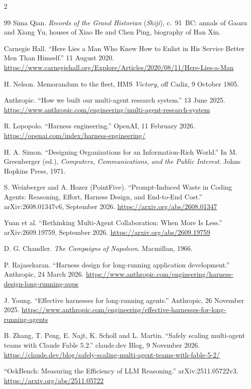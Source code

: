 \documentclass[11pt,letterpaper]{article}
\begin{document}
\begin{multicols}{2}
{\begin{thebibliography}{99}
 Sima Qian. \emph{Records of the Grand Historian} (\emph{Shiji}), c.~91~BC:
annals of Gaozu and Xiang Yu, houses of Xiao He and Chen Ping, biography of Han Xin.

 Carnegie Hall. ``Here Lies a Man Who Knew How to Enlist in His Service
Better Men Than Himself.'' 11 August 2020.
\url{https://www.carnegiehall.org/Explore/Articles/2020/08/11/Here-Lies-a-Man}

 H. Nelson. Memorandum to the fleet, HMS \emph{Victory}, off Cadiz,
9 October 1805.

 Anthropic. ``How we built our multi-agent research system.''
13 June 2025.
\url{https://www.anthropic.com/engineering/multi-agent-research-system}

 R. Lopopolo. ``Harness engineering.'' OpenAI, 11 February 2026.
\url{https://openai.com/index/harness-engineering/}

 H. A. Simon. ``Designing Organizations for an Information-Rich World.'' In
M. Greenberger (ed.), \emph{Computers, Communications, and the Public Interest}. Johns
Hopkins Press, 1971.

 S. Weinberger and A. Hozez (PointFive). ``Prompt-Induced Waste in Coding
Agents: Reasoning, Effort, Harness Design, and End-to-End Cost.'' arXiv:2608.01347v6,
September 2026.
\url{https://arxiv.org/abs/2608.01347}

 Yuan et al. ``Rethinking Multi-Agent Collaboration: When More Is Less.''
arXiv:2609.19759, September 2026.
\url{https://arxiv.org/abs/2609.19759}

 D. G. Chandler. \emph{The Campaigns of Napoleon}. Macmillan, 1966.

 P. Rajasekaran. ``Harness design for long-running application
development.'' Anthropic, 24 March 2026.
\url{https://www.anthropic.com/engineering/harness-design-long-running-apps}

 J. Young. ``Effective harnesses for long-running agents.'' Anthropic,
26 November 2025.
\url{https://www.anthropic.com/engineering/effective-harnesses-for-long-running-agents}

 B. Zhang, T. Peng, E. Najt, K. Scholl and L. Martin. ``Safely scaling
multi-agent teams with Claude Fable 5.2.'' claude.dev Blog, 9 November 2026.
\url{https://claude.dev/blog/safely-scaling-multi-agent-teams-with-fable-5-2/}

 ``OckBench: Measuring the Efficiency of LLM Reasoning.''
arXiv:2511.05722v3.
\url{https://arxiv.org/abs/2511.05722}


\end{thebibliography}}
\end{multicols}
\end{document}
